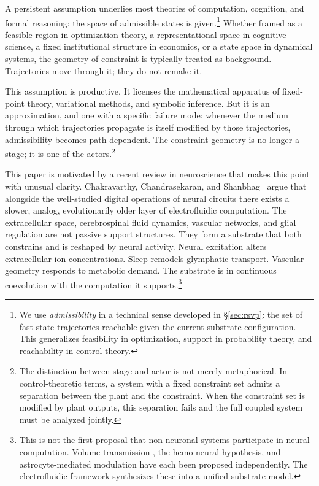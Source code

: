 \documentclass[12pt,a4paper]{article}
\begin{document}
A persistent assumption underlies most theories of computation, cognition, and formal reasoning: the space of admissible states is given.\footnote{We use \emph{admissibility} in a technical sense developed in \S\ref{sec:rsvp}: the set of fast-state trajectories reachable given the current substrate configuration. This generalizes feasibility in optimization, support in probability theory, and reachability in control theory.} Whether framed as a feasible region in optimization theory, a representational space in cognitive science, a fixed institutional structure in economics, or a state space in dynamical systems, the geometry of constraint is typically treated as background. Trajectories move through it; they do not remake it.

This assumption is productive. It licenses the mathematical apparatus of fixed-point theory, variational methods, and symbolic inference. But it is an approximation, and one with a specific failure mode: whenever the medium through which trajectories propagate is itself modified by those trajectories, admissibility becomes path-dependent. The constraint geometry is no longer a stage; it is one of the actors.\footnote{The distinction between stage and actor is not merely metaphorical. In control-theoretic terms, a system with a fixed constraint set admits a separation between the plant and the constraint. When the constraint set is modified by plant outputs, this separation fails and the full coupled system must be analyzed jointly.}

This paper is motivated by a recent review in neuroscience that makes this point with unusual clarity. Chakravarthy, Chandrasekaran, and Shanbhag~\cite{chakravarthy2026} argue that alongside the well-studied digital operations of neural circuits there exists a slower, analog, evolutionarily older layer of electrofluidic computation. The extracellular space, cerebrospinal fluid dynamics, vascular networks, and glial regulation are not passive support structures. They form a substrate that both constrains and is reshaped by neural activity. Neural excitation alters extracellular ion concentrations. Sleep remodels glymphatic transport. Vascular geometry responds to metabolic demand. The substrate is in continuous coevolution with the computation it supports.\footnote{This is not the first proposal that non-neuronal systems participate in neural computation. Volume transmission \cite{chakravarthy2026}, the hemo-neural hypothesis, and astrocyte-mediated modulation have each been proposed independently. The electrofluidic framework synthesizes these into a unified substrate model.}
\end{document}
